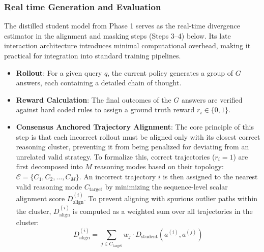 \documentclass[conference]{IEEEtran}
\begin{document}
\subsubsection{Real time Generation and Evaluation}
The distilled student model from Phase 1 serves as the real-time divergence estimator in the alignment and masking steps (Steps 3--4) below. Its late interaction architecture introduces minimal computational overhead, making it practical for integration into standard training pipelines.
\begin{itemize}
    \item[] \textbf{Rollout}: For a given query $q$, the current policy generates a group of $G$ answers, each containing a detailed chain of thought.
    \item[] \textbf{Reward Calculation}: The final outcomes of the $G$ answers are verified against hard coded rules to assign a ground truth reward $r_i \in \{0, 1\}$.
    \item[] \textbf{Consensus Anchored Trajectory Alignment}: The core principle of this step is that each incorrect rollout must be aligned only with its closest correct reasoning cluster, preventing it from being penalized for deviating from an unrelated valid strategy. To formalize this, correct trajectories ($r_i=1$) are first decomposed into $M$ reasoning modes based on their topology: $\mathcal{C} = \{C_1, C_2, \dots, C_M\}$. An incorrect trajectory $i$ is then assigned to the nearest valid reasoning mode $C_{\mathrm{target}}$ by minimizing the sequence-level scalar alignment score $D_{\mathrm{align}}^{(i)}$. To prevent aligning with spurious outlier paths within the cluster, $D_{\mathrm{align}}^{(i)}$ is computed as a weighted sum over all trajectories in the cluster:
    \begin{equation}
    D_{\mathrm{align}}^{(i)} = \sum_{j \in C_{\mathrm{target}}} w_j \cdot D_{\mathrm{student}}(a^{(i)}, a^{(j)})
    \end{equation}

\end{itemize}
\end{document}
